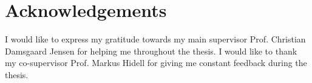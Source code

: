 \chapter{Acknowledgements}

I would like to express my gratitude towards my main supervisor Prof. Christian Damsgaard Jensen for helping me throughout the thesis. I would like to thank my co-supervisor Prof. Markus Hidell for giving me constant feedback during the thesis.


